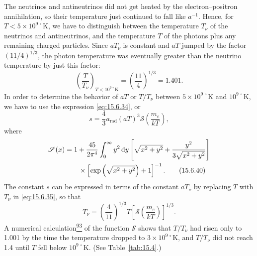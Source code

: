 The neutrinos and antineutrinos did not get heated by the electron--positron
annihilation, so their temperature just continued to fall like \(a^{-1}\).
Hence, for \(T<5\times10^{9\,\circ}\mathrm K\), we have to distinguish
between the temperature \(T_\nu\) of the neutrinos and antineutrinos, and the
temperature \(T\) of the photons plus any remaining charged particles. Since
\(aT_\nu\) is constant and \(aT\) jumped by the factor
\((11/4)^{1/3}\), the photon temperature was eventually greater than the
neutrino temperature by just this factor:
\begin{equation}
  \left(\frac{T}{T_\nu}\right)_{T<10^{9\,\circ}\mathrm K}
  =
  \left(\frac{11}{4}\right)^{1/3}
  =
  1.401.
  \tag{15.6.38}\label{eq:15.6.38}
\end{equation}
In order to determine the behavior of \(aT\) or \(T/T_\nu\) between
\(5\times10^{9\,\circ}\mathrm K\) and \(10^{9\,\circ}\mathrm K\), we have to
use the expression \eqref{eq:15.6.34}, or
\begin{equation}
  s
  =
  \frac43a_{\mathrm{rad}}(aT)^3
  \mathscr S\left(\frac{m_e}{kT}\right),
  \tag{15.6.39}\label{eq:15.6.39}
\end{equation}
where
\begin{align}
  \mathscr S(x)
  &=
  1+\frac{45}{2\pi^4}
  \int_0^\infty y^2\mathop{}\!\mathrm{d} y
  \left[
    \sqrt{x^2+y^2}
    +
    \frac{y^2}{3\sqrt{x^2+y^2}}
  \right]
  \notag\\
  &\qquad\times
  \left[\exp\left(\sqrt{x^2+y^2}\right)+1\right]^{-1}.
  \tag{15.6.40}\label{eq:15.6.40}
\end{align}
The constant \(s\) can be expressed in terms of the constant \(aT_\nu\) by
replacing \(T\) with \(T_\nu\) in \eqref{eq:15.6.35}, so that
\begin{equation}
  T_\nu
  =
  \left(\frac4{11}\right)^{1/3}
  T
  \left[
    \mathscr S\left(\frac{m_e}{kT}\right)
  \right]^{1/3}.
  \tag{15.6.41}\label{eq:15.6.41}
\end{equation}
A numerical calculation\hyperref[ch15-ref-93]{\textsuperscript{93}} of the
function \(\mathscr S\) shows that \(T/T_\nu\) had risen only to 1.001 by the
time the temperature dropped to \(3\times10^{9\,\circ}\mathrm K\), and
\(T/T_\nu\) did not reach 1.4 until \(T\) fell below
\(10^{9\,\circ}\mathrm K\). (See Table~\ref{tab:15.4}.)

